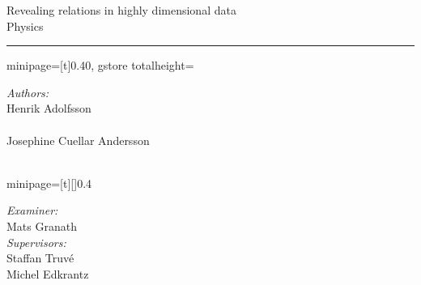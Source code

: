 
\begin{center}
	\bigskip
	\bigskip
	\Huge{Revealing relations in highly dimensional data}\\
	\bigskip
	\Large{Physics}
\end{center}

\bigskip
\bigskip
\noindent\rule{\linewidth}{0.4pt}
\bigskip

\newlength\myheight
\begin{center}
	\begin{adjustbox}{%
		minipage=[t]{0.40\linewidth},
		gstore totalheight=\myheight
	}
		\begin{flushleft}
			\large \emph{Authors:}\\
			Henrik Adolfsson\\
			\\[0.3cm]
			Josephine Cuellar Andersson\\
			\\[0.3cm] 
		\end{flushleft}
	\end{adjustbox}
	\hspace{0.5cm}
	\begin{adjustbox}{minipage=[t][\myheight]{0.4\linewidth}}
		\begin{flushright} \large
			\emph{Examiner:} \\
			Mats Granath\\ [0.3cm]

			\emph{Supervisors:} \\
			Staffan Truv\'e\\
			Michel Edkrantz\\
		\end{flushright}
	\end{adjustbox}
\end{center}

\vspace*{\fill}

\begin{center}
	\Large{%
		\whereandwhen
	}
\end{center}


\thispagestyle{empty}
\newpage

